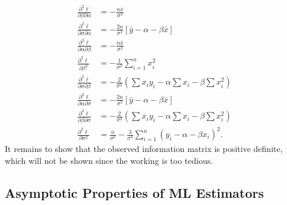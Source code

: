 \documentclass[notoc,notitlepage]{tufte-book}
\begin{document}
\begin{solution}
\begin{align*}
    \frac{\partial^2 \ell}{\partial \beta \partial \alpha} &= - \frac{n \bar{x}}{\sigma^2} \\
    \frac{\partial^2 \ell}{\partial \sigma \partial \alpha} &= - \frac{2n}{\sigma^3} \left[ \bar{y} - \alpha - \beta \bar{x} \right] \\
    \frac{\partial^2 \ell}{\partial \alpha \partial \beta} &= - \frac{n \bar{x}}{\sigma^2} \\
    \frac{\partial^2 \ell}{\partial \beta^2} &= - \frac{1}{\sigma^2} \sum_{i=1}^{n} x_i^2 \\
    \frac{\partial^2 \ell}{\partial \sigma \partial \beta} &= - \frac{2}{\sigma^3} \left( \sum x_i y_i - \alpha \sum x_i - \beta \sum x_i^2 \right) \\
    \frac{\partial^2 \ell}{\partial \alpha \partial \sigma} &= - \frac{2n}{\sigma^3} \left[ \bar{y} - \alpha - \beta \bar{x} \right] \\
    \frac{\partial^2 \ell}{\partial \beta \partial \sigma} &= - \frac{2}{\sigma^3} \left( \sum x_i y_i - \alpha \sum x_i - \beta \sum x_i^2 \right) \\
    \frac{\partial^2 \ell}{\partial \sigma^2} &= \frac{n}{\sigma^2} - \frac{3}{\sigma^4} \sum_{i=1}^{n} \left( y_i - \alpha - \beta x_i \right)^2.
  \end{align*}
  It remains to show that the observed information matrix is positive definite, which will not be shown since the working is too tedious.
\end{solution}


\subsection{Asymptotic Properties of ML Estimators}%
\label{sub:asymptotic_properties_of_ml_estimators}
\end{document}
